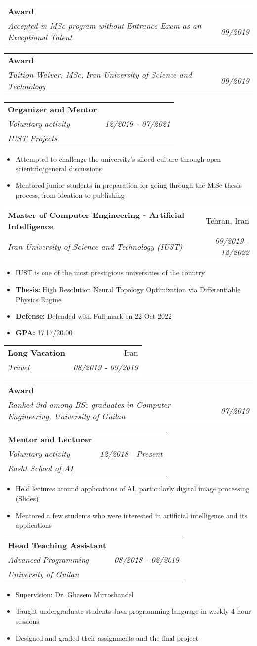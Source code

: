 \documentclass[letterpaper,11pt]{article}
\makeatletter
\newcommand{\resumeItem}[1]{
  \item\small{
    {#1 \vspace{-2pt}}
  }
}
\newcommand{\resumeSubheading}[5]{
  \item
    \begin{tabular*}{0.97\textwidth}{l@{\extracolsep{\fill}}r}
      \textbf{#1} & #2 \\ 
      \textit{\small#3} & \textit{\small #4} \\
      \textit{#5} & 
    \end{tabular*}\vspace{-5pt}
}
\newcommand{\resumeSubheadingF}[4]{
  \item
    \begin{tabular*}{0.97\textwidth}{l@{\extracolsep{\fill}}r}
      \textbf{#1} & #2 \\ 
      \textit{\small#3} & \textit{\small #4} \\
    \end{tabular*}\vspace{-5pt}
}
\newcommand{\resumeItemListStart}{\begin{itemize}}
\newcommand{\resumeItemListEnd}{\end{itemize}\vspace{-5pt}}
\makeatother
\begin{document}
    \resumeSubheadingF
      {Award}{}
      {Accepted in MSc program without Entrance Exam as an Exceptional Talent}{09/2019}

    \resumeSubheadingF
      {Award}{}
      {Tuition Waiver, MSc, Iran University of Science and Technology}{09/2019}
    
    \resumeSubheading
      {Organizer and Mentor}{}
      {Voluntary activity} 
      {12/2019 - 07/2021}{\href{http://iust-projects.ir/}{IUST Projects}}
      \resumeItemListStart
        \resumeItem{Attempted to challenge the university's siloed culture through open scientific/general discussions}
        \resumeItem{Mentored junior students in preparation for going through the M.Sc thesis process, from ideation to publishing}
      \resumeItemListEnd

    \resumeSubheadingF
      {Master of Computer Engineering - Artificial Intelligence}{Tehran, Iran}
      {Iran University of Science and Technology (IUST)}{09/2019 - 12/2022}
      \resumeItemListStart
        \resumeItem{\href{http://www.iust.ac.ir/}{IUST} is one of the most prestigious universities of the country}
        \resumeItem{\textbf{Thesis:} High Resolution Neural Topology Optimization via Differentiable Physics Engine}
        \resumeItem{\textbf{Defense:} Defended with Full mark on 22 Oct 2022}
        \resumeItem{\textbf{GPA:} 17.17/20.00}
      \resumeItemListEnd

    \resumeSubheadingF
      {Long Vacation}{Iran}
      {Travel}{08/2019 - 09/2019}

    \resumeSubheadingF
      {Award}{}
      {Ranked 3rd among BSc graduates in Computer Engineering, University of Guilan}{07/2019}
    

    \resumeSubheading
      {Mentor and Lecturer}{}
      {Voluntary activity} 
      {12/2018 - Present}{\href{http://schoolofai.ir/}{Rasht School of AI}}
      \resumeItemListStart
        \resumeItem{Held lectures around applications of AI, particularly digital image processing (\href{https://github.com/rasht-school-of-ai/Meetup-Materials}{Slides})}
        \resumeItem{Mentored a few students who were interested in artificial intelligence and its applications}
      \resumeItemListEnd

    \resumeSubheading
      {Head Teaching Assistant}{}
      {Advanced Programming} 
      {08/2018 - 02/2019}{University of Guilan}
      \resumeItemListStart
        \resumeItem{Supervision: \href{https://ir.linkedin.com/in/seyed-abolghasem-mirroshandel-1a3a5950}{Dr. Ghasem Mirroshandel}}
        \resumeItem{Taught undergraduate students Java programming language in weekly 4-hour sessions}
        \resumeItem{Designed and graded their assignments and the final project}
      \resumeItemListEnd
     
\end{document}

